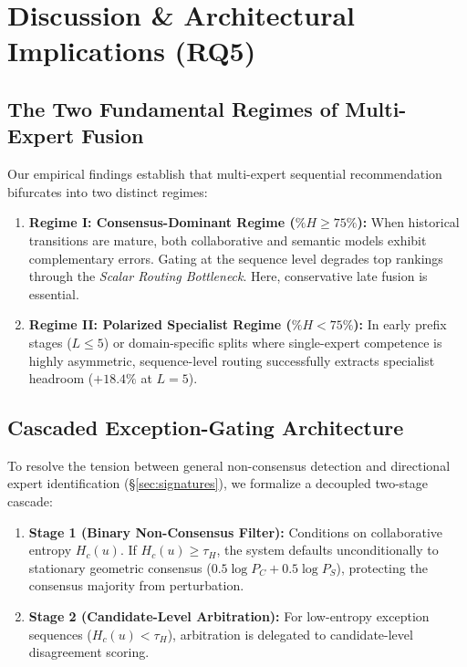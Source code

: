 
\section{Discussion \& Architectural Implications (RQ5)}
\label{sec:discussion}

\subsection{The Two Fundamental Regimes of Multi-Expert Fusion}
\label{sec:two_regimes}

Our empirical findings establish that multi-expert sequential recommendation bifurcates into two distinct regimes:
\begin{enumerate}[leftmargin=*]
    \item \textbf{Regime I: Consensus-Dominant Regime ($\%H \ge 75\%$):} When historical transitions are mature, both collaborative and semantic models exhibit complementary errors. Gating at the sequence level degrades top rankings through the \emph{Scalar Routing Bottleneck}. Here, conservative late fusion is essential.
    \item \textbf{Regime II: Polarized Specialist Regime ($\%H < 75\%$):} In early prefix stages ($L \le 5$) or domain-specific splits where single-expert competence is highly asymmetric, sequence-level routing successfully extracts specialist headroom ($+18.4\%$ at $L=5$).
\end{enumerate}

\subsection{Cascaded Exception-Gating Architecture}
\label{sec:cascaded_arch}

To resolve the tension between general non-consensus detection and directional expert identification (\S\ref{sec:signatures}), we formalize a decoupled two-stage cascade:
\begin{enumerate}[leftmargin=*]
    \item \textbf{Stage 1 (Binary Non-Consensus Filter):} Conditions on collaborative entropy $H_c(u)$. If $H_c(u) \ge \tau_H$, the system defaults unconditionally to stationary geometric consensus ($0.5 \log P_C + 0.5 \log P_S$), protecting the consensus majority from perturbation.
    \item \textbf{Stage 2 (Candidate-Level Arbitration):} For low-entropy exception sequences ($H_c(u) < \tau_H$), arbitration is delegated to candidate-level disagreement scoring.
\end{enumerate}

